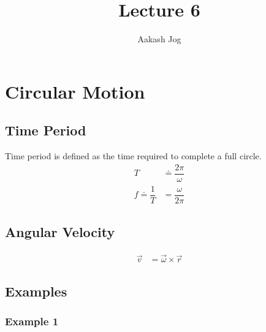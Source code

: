 \documentclass[fleqn]{article}
\title{Lecture 6}
\author{Aakash Jog}
\date{\formatdate{13}{11}{2014}}
\begin{document}
\maketitle

\tableofcontents

\newpage
\section{Circular Motion}

\subsection{Time Period}

Time period is defined as the time required to complete a full circle.
\begin{align*}
	T &\doteq \dfrac{2 \pi}{\omega}\\
	f \doteq \dfrac{1}{T} &= \dfrac{\omega}{2 \pi}
\end{align*}

\subsection{Angular Velocity}

\begin{align*}
	\overrightarrow{v} &= \overrightarrow{\omega} \times \overrightarrow{r}
\end{align*}

\subsection{Examples}

\subsubsection{Example 1}
\end{document}
